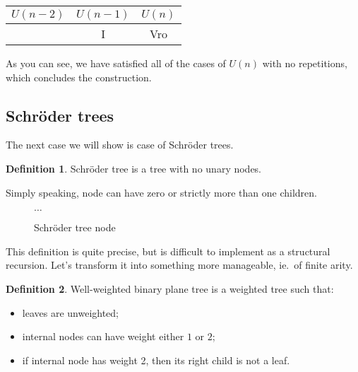 \documentclass[final]{article}
\theoremstyle{definition}
\newtheorem{definition}{Definition}[subsection]
\theoremstyle{remark}
\begin{document}
\begin{center}
    \begin{tabular}{| c | c | c |}
        \hline

        \(U(n-2)\) &
        \(U(n-1)\) &
        \(U(n)\)\\
        \hline

        &
        I  &
        Vro  \\
        \hline
    \end{tabular}
\end{center}


As you can see, we have satisfied all of the cases of \(U(n)\) with no repetitions, which concludes the construction.

\subsection{Schröder trees}%
\label{sub:schröder_trees}

The next case we will show is case of Schröder trees\cite{schroder}.

\begin{definition}
    Schröder tree is a tree with no unary nodes.
\end{definition}

Simply speaking, node can have zero or strictly more than one children.

\begin{figure}[h]
    \centering
    
    
    
    
    \(\ldots\)
    \caption{Schröder tree node}
    \label{fig:schroder_trees}
\end{figure}

This definition is quite precise, but is difficult to implement as a structural recursion. Let's transform it into something more manageable, ie.~of finite arity.

\begin{definition}
    Well-weighted binary plane tree is a weighted tree such that:
    \begin{itemize}
        \item leaves are unweighted;
        \item internal nodes can have weight either \(1\) or \(2\);
        \item if internal node has weight 2, then its right child is not a leaf.
    \end{itemize}
\end{definition}
\end{document}
